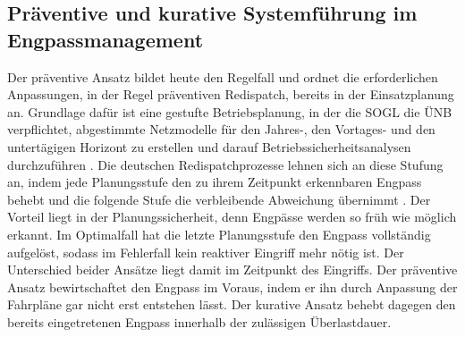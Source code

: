 \subsection{Präventive und kurative Systemführung im Engpassmanagement}
\label{sec:prev_vs_cur}

Der präventive Ansatz bildet heute den Regelfall und ordnet die erforderlichen Anpassungen, in der Regel präventiven Redispatch, bereits in der Einsatzplanung an.
Grundlage dafür ist eine gestufte Betriebsplanung, in der die \ac{SOGL} die \ac{ÜNB} verpflichtet, abgestimmte Netzmodelle für den Jahres-, den Vortages- und den untertägigen Horizont zu erstellen und darauf Betriebssicherheitsanalysen durchzuführen \cite{europaische_kommission_verordnung_2017}.
Die deutschen Redispatchprozesse lehnen sich an diese Stufung an, indem jede Planungsstufe den zu ihrem Zeitpunkt erkennbaren Engpass behebt und die folgende Stufe die verbleibende Abweichung übernimmt \cite{leeuwen_integration_2020}.
Der Vorteil liegt in der Planungssicherheit, denn Engpässe werden so früh wie möglich erkannt.
Im Optimalfall hat die letzte Planungsstufe den Engpass vollständig aufgelöst, sodass im Fehlerfall kein reaktiver Eingriff mehr nötig ist.
Der Unterschied beider Ansätze liegt damit im Zeitpunkt des Eingriffs.
Der präventive Ansatz bewirtschaftet den Engpass im Voraus, indem er ihn durch Anpassung der Fahrpläne gar nicht erst entstehen lässt.
Der kurative Ansatz behebt dagegen den bereits eingetretenen Engpass innerhalb der zulässigen Überlastdauer.

